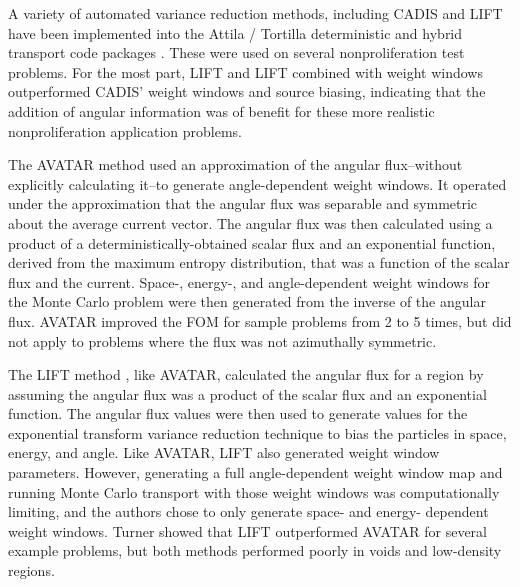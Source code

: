 A variety of automated variance reduction methods, including CADIS and LIFT have
been implemented into the Attila / Tortilla deterministic and hybrid transport
code packages \cite{somasundaram_implementation_2013}. These were used on several
nonproliferation test problems. For the most part, LIFT and LIFT combined with
weight windows outperformed CADIS' weight windows and source biasing, indicating
that the addition of angular information was of benefit for these more realistic
nonproliferation application
problems.

The AVATAR method
\cite{van_riper_generation_1995, van_riper_avatarautomatic_1997} used an
approximation of the angular flux--without explicitly calculating it--to
generate angle-dependent weight windows. It operated under the approximation
that
the angular flux was separable and symmetric about the average current vector.
The angular flux was then calculated using
a product of a deterministically-obtained
scalar flux and an exponential function, derived from the
maximum entropy distribution, that was a function of the scalar flux and the
current. Space-, energy-, and angle-dependent weight windows for
the Monte Carlo problem were then generated from the inverse of the angular
flux. AVATAR improved the FOM for sample problems from 2 to 5 times, but did not
apply to problems where the flux was not azimuthally symmetric.

The LIFT method \cite{turner_automatic_1997, turner_automatic_1997-1}, like
AVATAR, calculated the angular flux for a region by assuming the angular flux
was a product of the scalar flux and an exponential function. The angular flux
values were then used to generate values for the exponential transform variance
reduction
technique to bias the particles in space, energy, and angle. Like AVATAR, LIFT
also generated weight window parameters. However, generating a full
angle-dependent weight window map and running Monte Carlo transport with those
weight windows was computationally limiting, and the authors chose to only
generate space- and energy- dependent weight windows. Turner showed that LIFT
outperformed AVATAR for several example problems, but both methods performed
poorly in voids and low-density regions.

